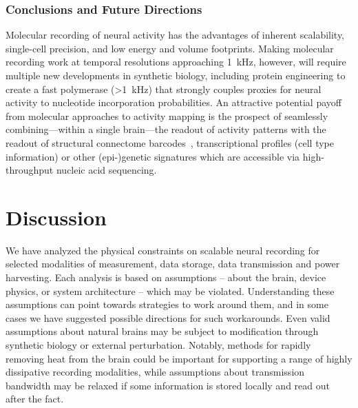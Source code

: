 \subsubsection{Conclusions and Future Directions}

Molecular recording of neural activity has the advantages of inherent scalability, single-cell precision, and low energy and volume footprints.
Making molecular recording work at temporal resolutions approaching \SI{1}{\kHz}, however, will require multiple new developments in synthetic biology, including protein engineering to create a fast polymerase (\SI{>1}{\kHz}) that strongly couples proxies for neural activity to nucleotide incorporation probabilities.
An attractive potential payoff from molecular approaches to activity mapping is the prospect of seamlessly combining---within a single brain---the readout of activity patterns with the readout of structural connectome barcodes~\cite{zador12}, transcriptional profiles (cell type information) or other (epi-)genetic signatures which are accessible via high-throughput nucleic acid sequencing.


\section{Discussion}

We have analyzed the physical constraints on scalable neural recording for selected modalities of measurement, data storage, data transmission and power harvesting.
Each analysis is based on assumptions -- about the brain, device physics, or system architecture -- which may be violated.
Understanding these assumptions can point towards strategies to work around them, and in some cases we have suggested possible directions for such workarounds.
Even valid assumptions about natural brains may be subject to modification through synthetic biology or external perturbation.
Notably, methods for rapidly removing heat from the brain could be important for supporting a range of highly dissipative recording modalities, while assumptions about transmission bandwidth may be relaxed if some information is stored locally and read out after the fact.

